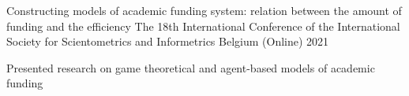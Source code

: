 \begin{cventries}
%
%
%
  \cventry
    {Constructing models of academic funding system: relation between the amount of funding and the efficiency} %
    {The 18th International Conference of the International Society for Scientometrics and Informetrics} %
    {Belgium (Online)} %
    {2021} %
    {
      \begin{cvitems} %
        \item {Presented research on game theoretical and agent-based models of academic funding}
      \end{cvitems}
    }


\end{cventries}
